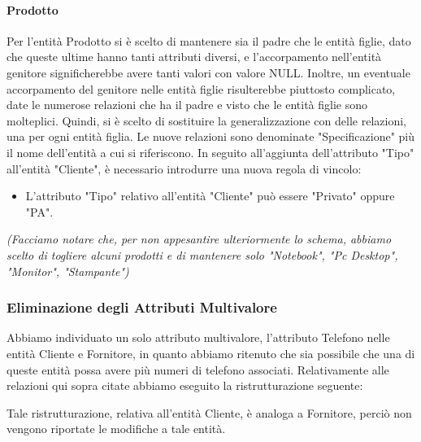 \paragraph{Prodotto}
Per l'entità Prodotto si è scelto di mantenere sia il padre che le entità figlie, dato che queste ultime hanno tanti attributi diversi, e l'accorpamento nell'entità genitore significherebbe avere tanti valori con valore NULL. Inoltre, un eventuale accorpamento del genitore nelle entità figlie risulterebbe piuttosto complicato, date le numerose relazioni che ha il padre e visto che le entità figlie sono molteplici.
Quindi, si è scelto di sostituire la generalizzazione con delle relazioni, una per ogni entità figlia. Le nuove relazioni sono denominate "Specificazione" più il nome dell'entità a cui si riferiscono.
\newline\newline
In seguito all'aggiunta dell'attributo "Tipo" all'entità "Cliente", è necessario introdurre una nuova regola di vincolo:

\begin{itemize}
  \item L'attributo "Tipo" relativo all'entità "Cliente" può essere "Privato" oppure "PA".
\end{itemize}
\noindent
\textit{(Facciamo notare che, per non appesantire ulteriormente lo schema, abbiamo scelto di togliere alcuni prodotti e di mantenere solo "Notebook", "Pc Desktop", "Monitor", "Stampante")}



\newpage
\begin{landscape} %



\end{landscape}


\newpage
\subsubsection{Eliminazione degli Attributi Multivalore}

Abbiamo individuato un solo attributo multivalore, l'attributo Telefono nelle entità Cliente e Fornitore, in quanto abbiamo ritenuto che sia possibile che una di queste entità possa avere più numeri di telefono associati.
\newline
Relativamente alle relazioni qui sopra citate abbiamo eseguito la ristrutturazione seguente:
\newline\newline

\noindent{}
\newline\newline
Tale ristrutturazione, relativa all'entità Cliente, è analoga a Fornitore, perciò non vengono riportate le modifiche a tale entità.

